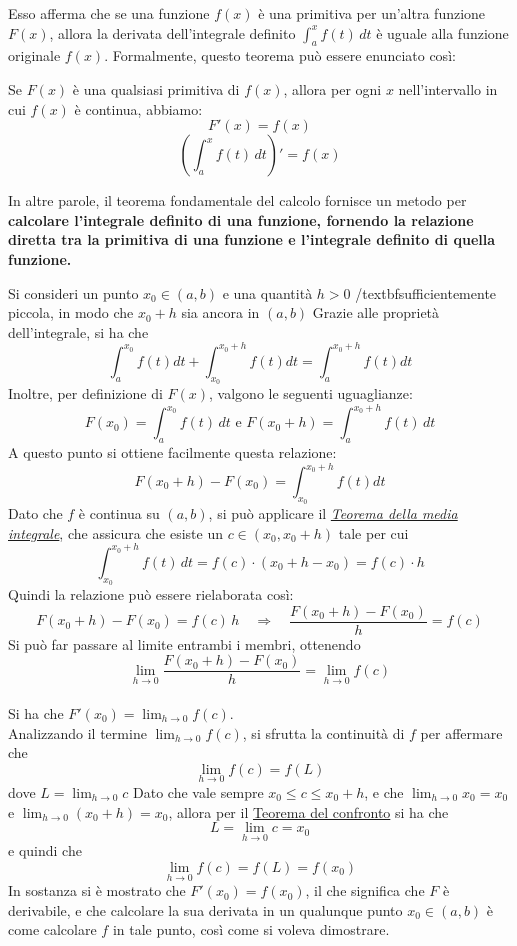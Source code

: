 \documentclass{article}
\begin{document}
Esso afferma che se una funzione $f(x)$ è una primitiva per un'altra funzione
$F(x)$, allora la derivata dell'integrale definito $\int_a^x f(t) \, dt$ è
uguale alla funzione originale $f(x)$. Formalmente, questo teorema può essere
enunciato così:

Se $F(x)$ è una qualsiasi primitiva di $f(x)$, allora per ogni $x$
nell'intervallo in cui $f(x)$ è continua, abbiamo: $$ F'(x) = f(x) $$ $$ \left(
    \int_a^x f(t) \, dt \right)' = f(x) $$

In altre parole, il teorema fondamentale del calcolo fornisce un metodo per
\textbf{calcolare l'integrale definito di una funzione, fornendo la relazione
    diretta tra la primitiva di una funzione e l'integrale definito di quella
    funzione.}

Si consideri un punto $x_0 \in (a,b)$ e una quantità $h > 0$ /textbf{sufficientemente
piccola}, in modo che $x_0 + h$ sia ancora in $(a,b)$ Grazie alle proprietà
dell'integrale, si ha che $$\int_a^{x_0} f(t)dt + \int_{x_0}^{x_0+h} f(t)dt =
    \int_a^{x_0+h}f(t)dt$$ Inoltre, per definizione di $F(x)$, valgono le seguenti
uguaglianze:$$F(x_0) = \int_a^{x_0} f(t) \, dt \text{ e } F(x_0 + h) =
    \int_a^{x_0+h}f(t) \, dt$$ A questo punto si ottiene facilmente questa
relazione: $$F(x_0+h) - F(x_0) = \int_{x_0}^{x_0 + h}f(t)dt$$ Dato che $f$ è
continua su $(a,b)$, si può applicare il \textit{\underline{Teorema della media
        integrale}}, che assicura che esiste un $c \in (x_0, x_0 + h)$ tale per cui
$$\int_{x_0}^{x_0 + h}f(t) \, dt = f(c) \cdot (x_0 +h - x_0) = f(c) \cdot
    h$$Quindi la relazione può essere rielaborata così: $$F(x_0+h) - F(x_0) = f(c)
    \, h \quad \Rightarrow \quad \frac{F(x_0+h) - F(x_0)}{h} = f(c)$$ Si può far
passare al limite entrambi i membri, ottenendo$$\lim_{h \to 0} \frac{F(x_0+h) -
        F(x_0)}{h} = \lim_{h \to 0}f(c)$$\\ Si ha che $F'(x_0) = \lim_{h \to
        0}f(c)$.\\Analizzando il termine $\lim_{h \to 0}f(c)$, si sfrutta la continuità
di $f$ per affermare che $$\lim_{h \to 0}f(c) = f(L)$$ dove $L = \lim_{h \to
        0}c$ Dato che vale sempre $x_0 \leq c \leq x_0 + h$, e che $\lim_{h \to 0}x_0 =
    x_0$ e $\lim_{h \to 0} ( x_0 + h )= x_0$, allora per il \underline{Teorema del
    confronto} si ha che \[L = \lim_{h \to 0}c = x_0\] e quindi che \[\lim_{h \to 0}f(c) = f(L) = f(x_0)\]
In sostanza si è mostrato che $F'(x_0) = f(x_0)$, il che significa che $F$ è
derivabile, e che calcolare la sua derivata in un qualunque punto $x_0 \in
    (a,b)$ è come calcolare $f$ in tale punto, così come si voleva dimostrare.
\end{document}
